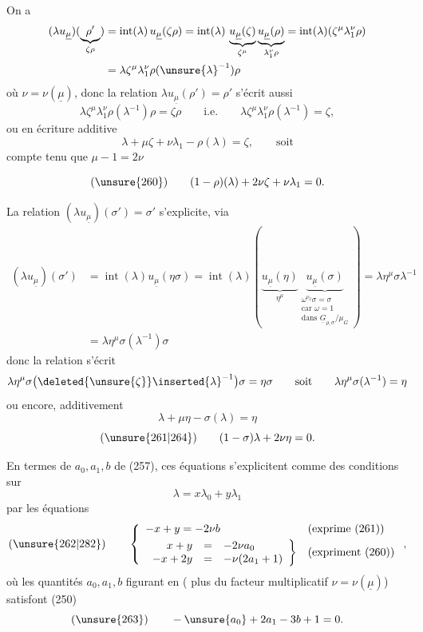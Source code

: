 On a\unsure{:}
\[
\begin{aligned}
(\lambda u_{\underline{\mu}})
(\underbrace{\rho'}_{\zeta\rho})
&=\operatorname{int}(\lambda)\,u_{\underline{\mu}}(\zeta\rho)
=\operatorname{int}(\lambda)\,
\underbrace{u_{\underline{\mu}}(\zeta)}_{\zeta^{\mu}}
\underbrace{u_{\underline{\mu}}(\rho)}_{\lambda_1^{\nu}\rho}
=\operatorname{int}(\lambda)(\zeta^{\mu}\lambda_1^{\nu}\rho)\\
&=\lambda\zeta^{\mu}\lambda_1^{\nu}\rho(\unsure{\lambda}^{-1})\rho
\end{aligned}
\]
où $\nu=\nu(\underline{\mu})$, donc la relation
$\lambda u_{\underline{\mu}}(\rho')=\rho'$ s'écrit aussi
\[
\lambda\zeta^{\mu}\lambda_1^{\nu}\rho(\lambda^{-1})\rho
=\zeta\rho\qquad\text{i.e.}\qquad
\lambda\zeta^{\mu}\lambda_1^{\nu}\rho(\lambda^{-1})=\zeta,
\]
ou en écriture additive
\[
\lambda+\mu\zeta+\nu\lambda_1-\rho(\lambda)=\zeta,
\qquad\text{soit}
\]
compte tenu que $\mu-1=2\nu$



\[
(\unsure{260})\qquad(1-\rho)(\lambda)+2\nu\zeta+\nu\lambda_1=0.
\]

La relation $(\lambda u_{\underline{\mu}})(\sigma')=\sigma'$ s'explicite, via
\[
\begin{aligned}
(\lambda u_{\underline{\mu}})(\sigma')
&=\operatorname{int}(\lambda)u_{\underline{\mu}}(\eta\sigma)
=\operatorname{int}(\lambda)\left(
\underbrace{u_{\underline{\mu}}(\eta)}_{\eta^{\mu}}
\underbrace{u_{\underline{\mu}}(\sigma)}_{
\substack{\omega^{\nu_2}\sigma=\sigma\\
\text{car }\omega=1\\
\text{dans }\underline{G}_{\rho,\sigma}/\mu_G}}
\right)=\lambda\eta^{\mu}\sigma\lambda^{-1}\\
&=\lambda\eta^{\mu}\sigma(\lambda^{-1})\sigma
\end{aligned}
\]
donc la relation  s'écrit
\[
\lambda\eta^{\mu}\sigma\bigl(\deleted{\unsure{\zeta}}\inserted{\lambda}^{-1}\bigr)\sigma
=\eta\sigma\qquad\text{soit}\qquad
\lambda\eta^{\mu}\sigma(\lambda^{-1})=\eta
\]
ou encore, additivement
\[
\lambda+\mu\eta-\sigma(\lambda)=\eta
\]
\[
(\unsure{261|264})\qquad(1-\sigma)\lambda+2\nu\eta=0.
\]

En termes de $a_0,a_1,b$ de (257), ces équations s'explicitent comme des
conditions sur
\[
\lambda=x\lambda_0+y\lambda_1
\]
par les équations
\[
(\unsure{262|282})\qquad
\left\{
\begin{array}{ll}
-x+y=-2\nu b&\text{(exprime (261))}\\[3pt]
\left.\begin{array}{rcl}
x+y&=&-2\nu a_0\\
-x+2y&=&-\nu(2a_1+1)
\end{array}\right\}&\text{(expriment (260))}
\end{array}\right.,
\]
où les quantités $a_0,a_1,b$ figurant en 
( plus du facteur multiplicatif
$\nu=\nu(\underline{\mu})$) satisfont (250)
\[
(\unsure{263})\qquad-\unsure{a_0}+2a_1-3b+1=0.
\]

